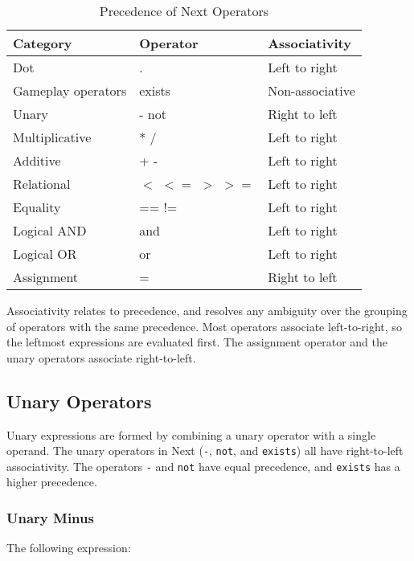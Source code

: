 \documentclass[12pt]{article}
\begin{document}
\begin{table}[htdp]
\caption{Precedence of Next Operators}
\begin{center}
\begin{tabular}{|l|l|l|}
\hline
\textbf{Category} & \textbf{Operator} & \textbf{Associativity} \\
\hline 
Dot & . & Left to right \\
\hline
Gameplay operators & exists & Non-associative \\
\hline
Unary & - not & Right to left \\
\hline
Multiplicative & * / & Left to right \\
\hline
Additive & + - & Left to right \\
\hline
Relational & $<$ $<=$ $>$ $>=$ & Left to right \\
\hline
Equality & == != & Left to right \\
\hline
Logical AND & and & Left to right \\
\hline
Logical OR & or & Left to right \\
\hline
Assignment & = & Right to left \\
\hline
\end{tabular}
\end{center}
\label{precedence}
\end{table} 

\noindent Associativity relates to precedence, and resolves any ambiguity over the grouping of operators with the same precedence.  Most operators associate left-to-right, so the leftmost expressions are evaluated first.  The assignment operator  and the unary operators associate right-to-left.

\subsection{Unary Operators}
Unary expressions are formed by combining a unary operator with a single operand.  The unary operators in Next (\texttt{-}, \texttt{not}, and \texttt{exists}) all have right-to-left associativity.  The operators \texttt{-} and \texttt{not} have equal precedence, and \texttt{exists} has a higher precedence.

\subsubsection {Unary Minus}

The following expression: \\
\end{document}
